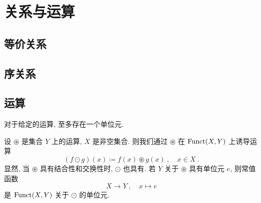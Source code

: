 \newpage

\section{关系与运算}

\subsection{等价关系}

\subsection{序关系}

\begin{remark}
    
\end{remark}

\begin{example}\label{eg:partially-ordered-set}
    
\end{example}

\begin{remark}
    
\end{remark}

\begin{example}
    
\end{example}

\begin{example}\label{eg:set-functions-monotone-and-bounded}
    
\end{example}

\subsection{运算}

\begin{proposition}\label{prop:identity-element-is-unique}
    对于给定的运算, 至多存在一个单位元.
\end{proposition}

\begin{example}\label{eg:operations-on-function-spaces}
    设 \(\circledast\) 是集合 \(Y\) 上的运算, \(X\) 是非空集合. 则我们通过 \(\circledast\) 在 \(\operatorname{Funct}(X,Y)\) 上诱导运算
    \[
        (f \odot g)(x) \coloneqq f(x) \circledast g(x)\ ,\quad x \in X\ .
    \]
    显然, 当 \(\circledast\) 具有结合性和交换性时, \(\odot\) 也具有. 若 \(Y\) 关于 \(\circledast\) 具有单位元 \(e\), 则常值函数
    \[
        X \to Y\ ,\quad x \mapsto e
    \]
    是 \(\operatorname{Funct}(X,Y)\) 关于 \(\odot\) 的单位元.
\end{example}

